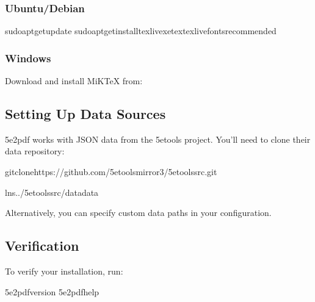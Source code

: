 \documentclass[letterpaper,10pt,english]{sphinxmanual}
\begin{document}
\subsubsection{Ubuntu/Debian}
\label{\detokenize{user-guide/installation:ubuntu-debian}}
\begin{sphinxVerbatim}[commandchars=\\\{\}]
sudoapt\PYGZhy{}getupdate
sudoapt\PYGZhy{}getinstalltexlive\PYGZhy{}xetextexlive\PYGZhy{}fonts\PYGZhy{}recommended
\end{sphinxVerbatim}


\subsubsection{Windows}
\label{\detokenize{user-guide/installation:windows}}
\sphinxAtStartPar
Download and install MiKTeX from:

\sphinxAtStartPar
{}


\subsection{Setting Up Data Sources}
\label{\detokenize{user-guide/installation:setting-up-data-sources}}
\sphinxAtStartPar
5e2pdf works with JSON data from the 5etools project. You’ll need to clone their data repository:

\begin{sphinxVerbatim}[commandchars=\\\{\}]
gitclonehttps://github.com/5etools\PYGZhy{}mirror\PYGZhy{}3/5etools\PYGZhy{}src.git

ln\PYGZhy{}s../5etools\PYGZhy{}src/datadata
\end{sphinxVerbatim}

\sphinxAtStartPar
Alternatively, you can specify custom data paths in your configuration.


\subsection{Verification}
\label{\detokenize{user-guide/installation:verification}}
\sphinxAtStartPar
To verify your installation, run:

\begin{sphinxVerbatim}[commandchars=\\\{\}]
5e2pdf\PYGZhy{}\PYGZhy{}version
5e2pdf\PYGZhy{}\PYGZhy{}help
\end{sphinxVerbatim}
\end{document}
